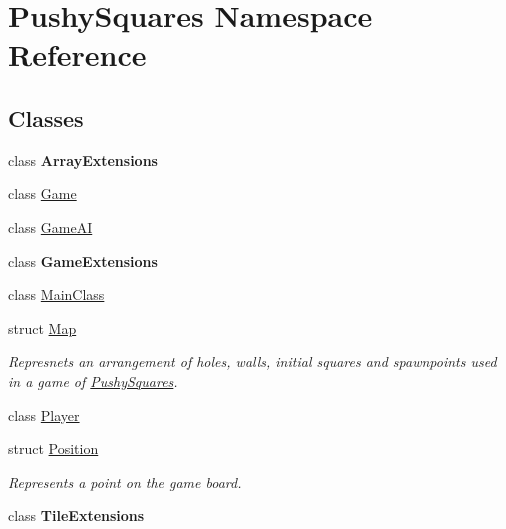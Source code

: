 \hypertarget{namespace_pushy_squares}{}\section{Pushy\+Squares Namespace Reference}
\label{namespace_pushy_squares}
\subsection*{Classes}
\begin{DoxyCompactItemize}
\item 
class {\bfseries Array\+Extensions}
\item 
class \hyperlink{class_pushy_squares_1_1_game}{Game}
\item 
class \hyperlink{class_pushy_squares_1_1_game_a_i}{Game\+AI}
\item 
class {\bfseries Game\+Extensions}
\item 
class \hyperlink{class_pushy_squares_1_1_main_class}{Main\+Class}
\item 
struct \hyperlink{struct_pushy_squares_1_1_map}{Map}
\begin{DoxyCompactList}\small\item\em Represnets an arrangement of holes, walls, initial squares and spawnpoints used in a game of \hyperlink{namespace_pushy_squares}{Pushy\+Squares}. \end{DoxyCompactList}\item 
class \hyperlink{class_pushy_squares_1_1_player}{Player}
\item 
struct \hyperlink{struct_pushy_squares_1_1_position}{Position}
\begin{DoxyCompactList}\small\item\em Represents a point on the game board. \end{DoxyCompactList}\item 
class {\bfseries Tile\+Extensions}
\end{DoxyCompactItemize}
